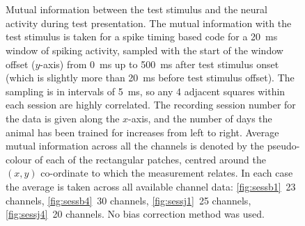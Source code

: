 \begin{figure}[htbp]%
    \centering
    ~~
    \\
    ~~
    \caption{Mutual information between the test stimulus and the neural activity during test presentation.
The mutual information with the test stimulus is taken for a spike timing based code for a \SI{20}{ms} window of spiking activity, sampled with the start of the window offset ($y$-axis) from \SI{0}{ms} up to \SI{500}{ms} after test stimulus onset (which is slightly more than \SI{20}{ms} before test stimulus offset).
The sampling is in intervals of \SI{5}{ms}, so any 4 adjacent squares within each session are highly correlated.
The recording session number for the data is given along the $x$-axis, and the number of days the animal has been trained for increases from left to right.
Average mutual information across all the channels is denoted by the pseudo-colour of each of the rectangular patches, centred around the $(x,y)$ co-ordinate to which the measurement relates.
In each case the average is taken across all available channel data: \ref{fig:sessb1}~23 channels, \ref{fig:sessb4}~30 channels, \ref{fig:sessj1}~25 channels, \ref{fig:sessj4}~20 channels.
No bias correction method was used.
}
    \label{fig:sess}
\end{figure}


